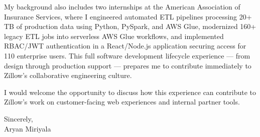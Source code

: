 \documentclass[letterpaper,11pt]{article}
\begin{document}
My background also includes two internships at the American Association of Insurance Services, where I engineered automated ETL pipelines processing 20+ TB of production data using Python, PySpark, and AWS Glue, modernized 160+ legacy ETL jobs into serverless AWS Glue workflows, and implemented RBAC/JWT authentication in a React/Node.js application securing access for 110 enterprise users. This full software development lifecycle experience — from design through production support — prepares me to contribute immediately to Zillow's collaborative engineering culture.

I would welcome the opportunity to discuss how this experience can contribute to Zillow's work on customer-facing web experiences and internal partner tools.

\vspace{12pt}

Sincerely,\\

Aryan Miriyala
\end{document}
